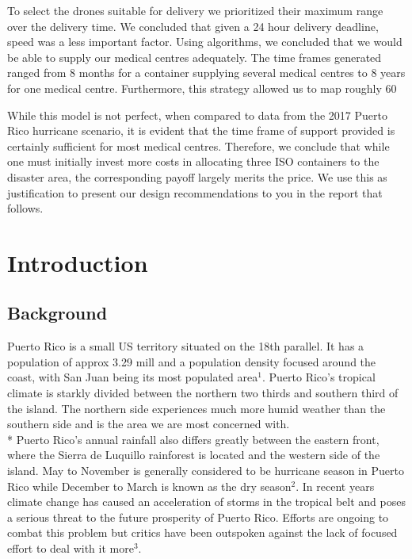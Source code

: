 \documentclass[a4paper,12pt]{article}
\begin{document}
To select the drones suitable for delivery we prioritized their maximum range over the delivery time. We concluded that given a 24 hour delivery deadline, speed was a less important factor. Using algorithms, we concluded that we would be able to supply our medical centres adequately. The time frames generated ranged from 8 months for a container supplying several medical centres to 8 years for one medical centre. Furthermore, this strategy allowed us to map roughly 60%

While this model is not perfect, when compared to data from the 2017 Puerto Rico hurricane scenario, it is evident that the time frame of support provided is certainly sufficient for most medical centres. Therefore, we conclude that while one must initially invest more costs in allocating three ISO containers to the disaster area, the corresponding payoff largely merits the price. We use this as justification to present our design recommendations to you in the report that follows.

\newpage


\tableofcontents
\newpage



\newpage

\pagestyle{style1}


\section{Introduction}

\subsection{Background}
Puerto Rico is a small US territory situated on the 18th parallel. It has a population of approx 3.29 mill and a population density focused around the coast,
with San Juan being its most populated area$^{1}$. Puerto Rico's tropical climate is starkly divided between the northern two thirds and southern third of the island.
The northern side experiences much more humid weather than the southern side and is the area we are most concerned with.\\* Puerto Rico's annual rainfall also differs greatly between the eastern front, where the Sierra de Luquillo rainforest is located and the western side of the island.
May to November is generally considered to be hurricane season in Puerto Rico while December to March is known as the dry season$^{2}$.
In recent years climate change has caused an acceleration of storms in the tropical belt and poses a serious threat to the future prosperity of Puerto Rico. Efforts are ongoing to combat this problem but critics have been outspoken against the lack
of focused effort to deal with it more$^{3}$.
\end{document}

